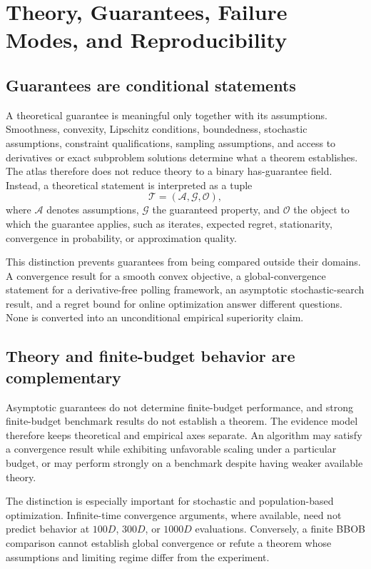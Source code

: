\section{Theory, Guarantees, Failure Modes, and Reproducibility}
\label{sec:theory-repro}

\subsection{Guarantees are conditional statements}

A theoretical guarantee is meaningful only together with its assumptions. Smoothness, convexity, Lipschitz conditions, boundedness, stochastic assumptions, constraint qualifications, sampling assumptions, and access to derivatives or exact subproblem solutions determine what a theorem establishes. The atlas therefore does not reduce theory to a binary has-guarantee field. Instead, a theoretical statement is interpreted as a tuple
\begin{equation}
\mathcal{T}=\left(\mathcal{A},\mathcal{G},\mathcal{O}\right),
\end{equation}
where \(\mathcal{A}\) denotes assumptions, \(\mathcal{G}\) the guaranteed property, and \(\mathcal{O}\) the object to which the guarantee applies, such as iterates, expected regret, stationarity, convergence in probability, or approximation quality.

This distinction prevents guarantees from being compared outside their domains. A convergence result for a smooth convex objective, a global-convergence statement for a derivative-free polling framework, an asymptotic stochastic-search result, and a regret bound for online optimization answer different questions. None is converted into an unconditional empirical superiority claim.

\subsection{Theory and finite-budget behavior are complementary}

Asymptotic guarantees do not determine finite-budget performance, and strong finite-budget benchmark results do not establish a theorem. The evidence model therefore keeps theoretical and empirical axes separate. An algorithm may satisfy a convergence result while exhibiting unfavorable scaling under a particular budget, or may perform strongly on a benchmark despite having weaker available theory.

The distinction is especially important for stochastic and population-based optimization. Infinite-time convergence arguments, where available, need not predict behavior at \(100D\), \(300D\), or \(1000D\) evaluations. Conversely, a finite BBOB comparison cannot establish global convergence or refute a theorem whose assumptions and limiting regime differ from the experiment.

